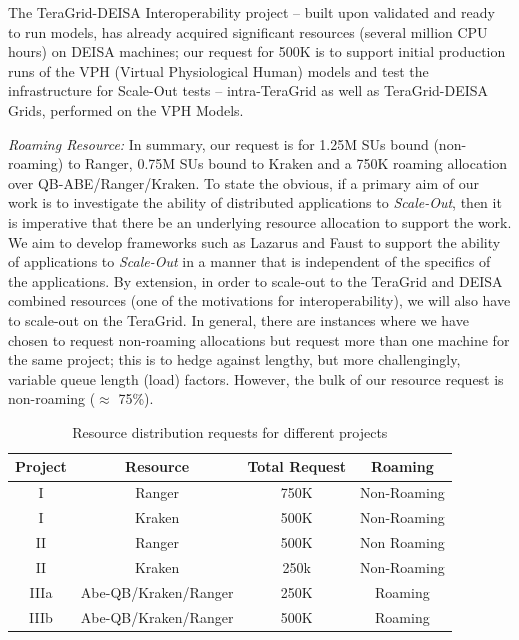 \documentclass[a4paper,10pt]{article}
\begin{document}
The TeraGrid-DEISA Interoperability project -- built upon validated and ready to run models, has already acquired significant resources (several million CPU hours) on DEISA machines; our request for 500K is to support initial production runs of the VPH (Virtual Physiological Human) models and test the infrastructure for Scale-Out tests -- intra-TeraGrid as well as TeraGrid-DEISA Grids, performed on the VPH Models.

{\it Roaming Resource:} In summary, our request is for 1.25M SUs bound (non-roaming) to Ranger, 0.75M SUs bound to Kraken and a 750K roaming allocation over QB-ABE/Ranger/Kraken.  To state the obvious, if a primary aim of our work is to investigate the ability of distributed applications to {\it Scale-Out}, then it is imperative that there be an underlying resource allocation to support the work. We aim to develop frameworks such as Lazarus and Faust to support the ability of applications to {\it Scale-Out} in a manner that is independent of the specifics of the applications.  By extension, in order to scale-out to the TeraGrid and DEISA combined resources (one of the motivations for interoperability), we will also have to scale-out on the TeraGrid.  In general, there are instances where we have chosen to request non-roaming allocations but request more than one machine for the same project; this is to hedge against lengthy, but more challengingly, variable queue length (load) factors. However, the bulk of our resource request is non-roaming ($\approx$ 75\%).

\begin{table}[!h]
\begin{center}
  \caption{Resource distribution requests for different projects\newline}
\label{table:systems}
\begin{tabular}{|c| c | c | c | }
\hline 
Project & Resource & Total Request & Roaming \\
\hline
I & Ranger  & 750K & Non-Roaming \\
I & Kraken &  500K  & Non-Roaming \\
\hline
II & Ranger & 500K & Non Roaming \\
II & Kraken & 250k & Non-Roaming \\
\hline
IIIa & Abe-QB/Kraken/Ranger & 250K & Roaming \\
IIIb & Abe-QB/Kraken/Ranger & 500K & Roaming \\
\hline
\end{tabular}
\end{center}
\end{table}
\end{document}
